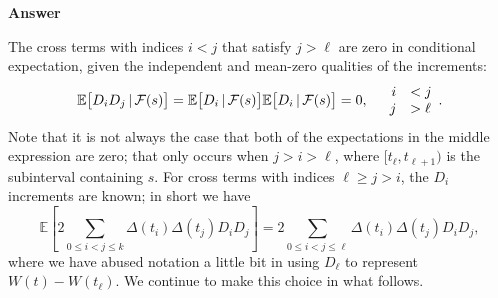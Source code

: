 \documentclass[11pt]{article}
\newcommand\E{\mathbb{E}}
\newcommand\cF{\mathcal{F}}
\newenvironment{hwanswer}
    {
        \vspace{2mm}
        {\bfseries Answer}
        \vspace{-\abovedisplayskip}
        \begin{center}
            \begin{tcolorbox}[
                width=0.95\textwidth,
                colback=white,
                colframe=white,
                opacityback=0,
                opacityframe=0,
                boxrule=0pt,
                frame hidden,
                breakable,
                before upper={\parindent15pt} %
            ]
            \lineskip=0pt %
    }
    {
        \end{tcolorbox}
        \end{center}
        \vspace{4mm}
    }
\begin{document}
\begin{hwanswer}
\begin{enumerate}[(i)]
            The cross terms with indices $i < j$ that satisfy $j > \ell$ are zero in
            conditional expectation, given the independent and mean-zero qualities of the
            increments:
            \[
                \E\big[
                    D_{i} D_{j}
                    \, | \,
                    \cF(s)
                \big]
                =
                \E\big[
                    D_{i}
                    \, | \,
                    \cF(s)
                \big]
                \E\big[
                    D_{i}
                    \, | \,
                    \cF(s)
                \big]
                =
                0,
                \quad
                \begin{array}{r l}
                    i &< j \\
                    j &> \ell
                \end{array}.
            \]
            Note that it is not always the case that both of the expectations in the middle
            expression are zero; that only occurs when $j > i > \ell$, where $[t_{\ell},
            t_{\ell+1})$ is the subinterval containing $s$. For cross terms with indices
            $\ell \geq j > i$, the $D_{i}$ increments are known; in short we have
            \[
                \E\left[
                    2
                    \sum_{0 \leq i < j \leq k}
                    \Delta(t_i) \Delta(t_j)
                    D_i D_j
                \right]
                =
                2 \sum_{0 \leq i < j \leq \ell}
                \Delta(t_i) \Delta(t_j)
                D_i D_j,
            \]
            where we have abused notation a little bit in using $D_{\ell}$ to represent
            $W(t) - W(t_{\ell})$. We continue to make this choice in what follows.


\end{enumerate}
\end{hwanswer}
\end{document}
